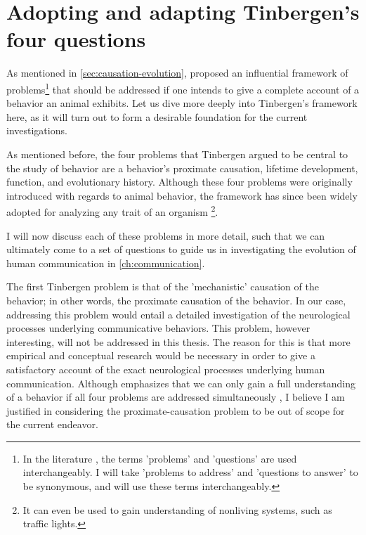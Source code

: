 \section{Adopting and adapting Tinbergen's four questions}
\label{sec:tinbergen}
As mentioned in \cref{sec:causation-evolution}, \citet{Tinbergen63} proposed an influential framework of problems\footnote{In the literature \citep[e.g.][]{BatesonLaland13}, the terms 'problems' and 'questions' are used interchangeably. I will take 'problems to address' and 'questions to answer' to be synonymous, and will use these terms interchangeably.} that should be addressed if one intends to give a complete account of a behavior an animal exhibits. Let us dive more deeply into Tinbergen's framework here, as it will turn out to form a desirable foundation for the current investigations.

As mentioned before, the four problems that Tinbergen argued to be central to the study of behavior are a behavior's proximate causation, lifetime development, function, and evolutionary history.
Although these four problems were originally introduced with regards to animal behavior, the framework has since been widely adopted for analyzing any trait of an organism \citep{BatesonLaland13}\footnote{It can even be used to gain understanding of nonliving systems, such as traffic lights.}.

I will now discuss each of these problems in more detail, such that we can ultimately come to a set of questions to guide us in investigating the evolution of human communication in \cref{ch:communication}.

The first Tinbergen problem is that of the 'mechanistic' causation of the behavior; in other words, the proximate causation of the behavior. In our case, addressing this problem would entail a detailed investigation of the neurological processes underlying communicative behaviors.
This problem, however interesting, will not be addressed in this thesis. The reason for this is that more empirical and conceptual research would be necessary in order to give a satisfactory account of the exact neurological processes underlying human communication. Although \citet{Tinbergen63} emphasizes that we can only gain a full understanding of a behavior if all four problems are addressed simultaneously \citep[see also][]{BatesonLaland13}, I believe I am justified in considering the proximate-causation problem to be out of scope for the current endeavor.

